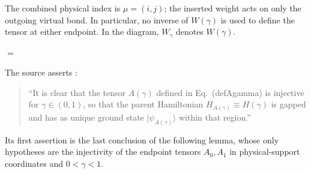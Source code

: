 The combined physical index is $\mu=(i,j)$; the inserted weight acts on
only the outgoing virtual bond. In particular, no inverse of $W(\gamma)$
is used to define the tensor at either endpoint. In the diagram,
$W_\gamma$ denotes $W(\gamma)$.
\begin{tenkzequation}
    \begin{tenkz}[rows={wire}, cols=1, bonds=none]
    \end{tenkz}
    \quad $=$ \quad
    \begin{tenkz}[rows={wire}, cols=2, bonds=none]
    \end{tenkz}
\end{tenkzequation}

The source asserts \cite[Section~5]{GarreRubio2023MPOSym}:
\begin{quote}
    ``It is clear that the tensor $A(\gamma)$ defined in Eq.~(defAgamma)
    is injective for $\gamma \in (0,1)$, so that the parent Hamiltonian
    $H_{A(\gamma)} \equiv H(\gamma)$ is gapped and has as unique ground
    state $|\psi_{A(\gamma)} \rangle$ within that region.''
\end{quote}
Its first assertion is the last conclusion of the following lemma, whose
only hypotheses are the injectivity of the endpoint tensors $A_0,A_1$ in
physical-support coordinates and $0<\gamma<1$.

